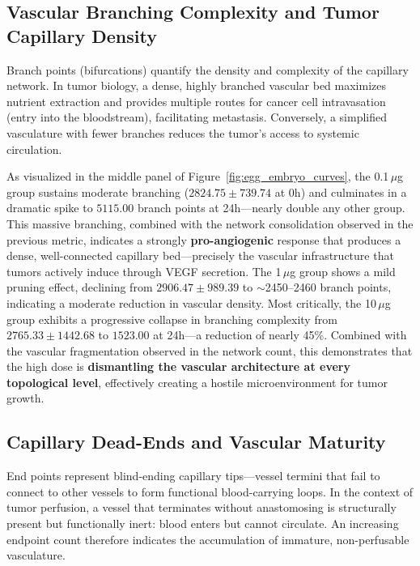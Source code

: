 \subsection{Vascular Branching Complexity and Tumor Capillary Density}
Branch points (bifurcations) quantify the density and complexity of the capillary network. In tumor biology, a dense, highly branched vascular bed maximizes nutrient extraction and provides multiple routes for cancer cell intravasation (entry into the bloodstream), facilitating metastasis. Conversely, a simplified vasculature with fewer branches reduces the tumor's access to systemic circulation.

As visualized in the middle panel of Figure~\ref{fig:egg_embryo_curves}, the 0.1\,$\mu$g group sustains moderate branching ($2824.75 \pm 739.74$ at 0h) and culminates in a dramatic spike to $5115.00$ branch points at 24h---nearly double any other group. This massive branching, combined with the network consolidation observed in the previous metric, indicates a strongly \textbf{pro-angiogenic} response that produces a dense, well-connected capillary bed---precisely the vascular infrastructure that tumors actively induce through VEGF secretion. The 1\,$\mu$g group shows a mild pruning effect, declining from $2906.47 \pm 989.39$ to $\sim$2450--2460 branch points, indicating a moderate reduction in vascular density. Most critically, the 10\,$\mu$g group exhibits a progressive collapse in branching complexity from $2765.33 \pm 1442.68$ to $1523.00$ at 24h---a reduction of nearly 45\%. Combined with the vascular fragmentation observed in the network count, this demonstrates that the high dose is \textbf{dismantling the vascular architecture at every topological level}, effectively creating a hostile microenvironment for tumor growth.

\subsection{Capillary Dead-Ends and Vascular Maturity}
End points represent blind-ending capillary tips---vessel termini that fail to connect to other vessels to form functional blood-carrying loops. In the context of tumor perfusion, a vessel that terminates without anastomosing is structurally present but functionally inert: blood enters but cannot circulate. An increasing endpoint count therefore indicates the accumulation of immature, non-perfusable vasculature.

